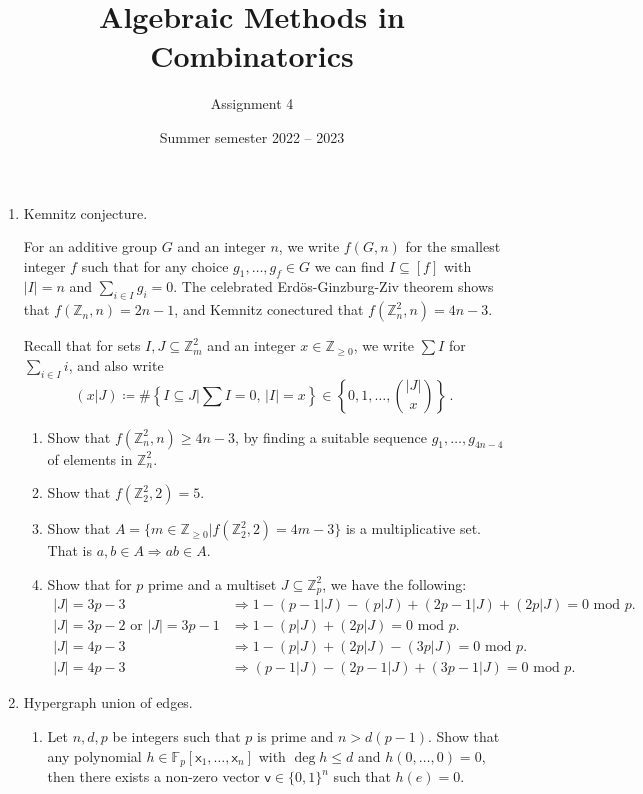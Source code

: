 \documentclass[kulak]{tplt}
\title{Algebraic Methods in Combinatorics}
\author{Assignment 4}
\date{Summer semester 2022 -- 2023}
\theoremstyle{definition}
\newcommand{\Z}{\mathbb{Z}}
\newcommand{\F}{\mathbb{F}}
\newcommand{\vv}{\mathsf{v}}
\newcommand{\vx}{\mathsf{x}}
\begin{document}
\maketitle
\vspace{2mm}
\begin{enumerate}
\item Kemnitz conjecture.

For an additive group $G$ and an integer $n$, we write $f(G, n)$ for the smallest integer $f$ such that for any choice $g_1, \ldots, g_f \in G$ we can find $I\subseteq [f]$ with $|I| = n$ and $\sum_{i\in I} g_i = 0$.
The celebrated Erd\"os-Ginzburg-Ziv theorem shows that $f(\Z_n, n) = 2n -1$, and Kemnitz conectured that $f(\Z_n^2, n) = 4n-3$.

Recall that for sets $I, J\subseteq \Z_m^2$ and an integer $x\in\Z_{\geq 0}$, we write $\sum I $ for $\sum_{i\in I} i$, and also write
$$ (x | J) \coloneqq \# \left\{ I \subseteq J \Big| \sum I = 0, \, |I| = x \right\} \in \left\{ 0, 1, \ldots, \binom{|J|}{x} \right\}\, . $$

\begin{enumerate}
\item Show that $f(\Z_n^2, n) \geq 4n-3$, by finding a suitable sequence $g_1, \ldots, g_{4n-4}$ of elements in $\Z_n^2$.

\item Show that $f(\Z^2_2, 2) = 5$.

\item Show that $A = \{m\in \Z_{\geq 0} | f(\Z^2_2, 2) = 4m - 3 \} $ is a multiplicative set.
That is $a, b\in A \Rightarrow ab \in A$.

\item Show that for $p$ prime and a multiset $J \subseteq \Z_p^2$, we have the following:
\begin{align*}
|J| = 3p - 3 &\Rightarrow 1 - (p-1|J) - (p|J) + (2p-1|J) +(2p|J)  = 0 \text{ mod $p$.} \\
|J| = 3p - 2 \text{ or } |J| = 3p - 1 &\Rightarrow 1 - (p|J) + (2p|J)  = 0 \text{ mod $p$.} \\
|J| = 4p - 3 &\Rightarrow 1 - (p|J) + (2p|J) - (3p|J)  = 0 \text{ mod $p$.} \\
|J| = 4p - 3 &\Rightarrow (p-1|J) - (2p-1|J) + (3p-1|J)  = 0 \text{ mod $p$.}
\end{align*}
\end{enumerate}


\item Hypergraph union of edges.

\begin{enumerate}
\item Let $n, d, p$ be integers such that $p$ is prime and $n > d(p-1)$.
Show that any polynomial $h \in \F_p[\vx_1, \ldots, \vx_n]$ with $\deg h \leq d$ and $h(0, \ldots, 0) = 0$, then there exists a non-zero vector $\vv \in \{0, 1 \}^n$ such that $h(e) = 0$.


\end{enumerate}
\end{enumerate}
\end{document}
